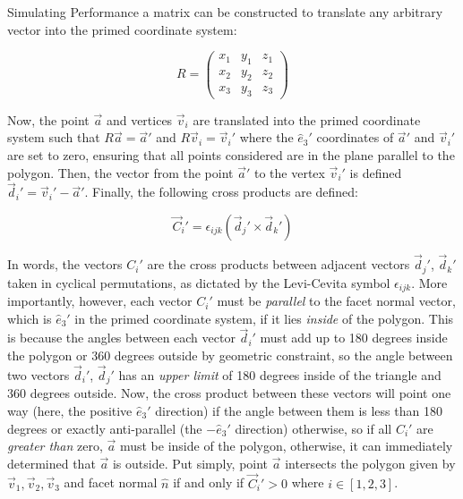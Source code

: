\begin{section}{Simulating Performance}
\noindent a matrix can be constructed to translate any arbitrary vector into the primed coordinate system:

\begin{equation}
    R = \begin{pmatrix} 
        x_1 & y_1 & z_1 \\
        x_2 & y_2 & z_2 \\
        x_3 & y_3 & z_3
    \end{pmatrix}
\end{equation}

\noindent Now, the point $\vec{a}$ and vertices $\vec{v}_i$ are translated into the primed coordinate system such that $R\vec{a} = \vec{a}'$ and $R\vec{v}_i = \vec{v}_{i}'$ where the $\hat{e}_3'$ coordinates of $\vec{a}'$ and $\vec{v}_i'$ are set to zero, ensuring that all points considered are in the plane parallel to the polygon. Then, the vector from the point $\vec{a}'$ to the vertex $\vec{v}_{i}'$ is defined $\vec{d}_{i}' = \vec{v}_{i}'-\vec{a}'$. Finally, the following cross products are defined:

\begin{equation}
    \vec{C}_{i}' = \epsilon_{ijk}(\vec{d}_{j}'\times\vec{d}_{k}')
\end{equation}

\noindent In words, the vectors $C_{i}'$ are the cross products between adjacent vectors $\vec{d}_{j}'$, $\vec{d}_{k}'$ taken in cyclical permutations, as dictated by the Levi-Cevita symbol $\epsilon_{ijk}$. More importantly, however, each vector $C_{i}'$ must be \textit{parallel} to the facet normal vector, which is $\hat{e}_{3}'$ in the primed coordinate system, if it lies \textit{inside} of the polygon. This is because the angles between each vector $\vec{d}_{i}'$ must add up to 180 degrees inside the polygon or 360 degrees outside by geometric constraint, so the angle between two vectors $\vec{d}_{i}'$, $\vec{d}_{j}'$ has an \textit{upper limit} of 180 degrees inside of the triangle and 360 degrees outside. Now, the cross product between these vectors will point one way (here, the positive $\hat{e}_3'$ direction) if the angle between them is less than 180 degrees or exactly anti-parallel (the $-\hat{e}_3'$ direction) otherwise, so if all $C_{i}'$ are \textit{greater than} zero, $\vec{a}$ must be inside of the polygon, otherwise, it can immediately determined that $\vec{a}$ is outside. Put simply, point $\vec{a}$ intersects the polygon given by $\vec{v}_1, \vec{v}_2, \vec{v}_3$ and facet normal $\hat{n}$ if and only if $\vec{C}_{i}' > 0$ where $i\in[1,2,3]$.


\end{section}
